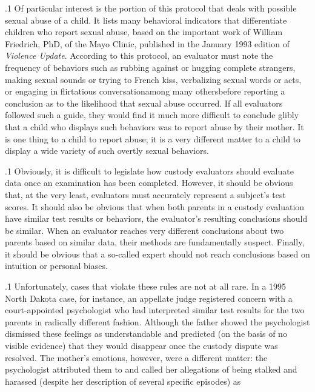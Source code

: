 \documentclass[11pt, twoside]{article}
\begin{document}
{\p.1{%
Of particular interest is the portion of this protocol that deals with
possible sexual abuse of a child. It lists many behavioral indicators that
differentiate children who report sexual abuse, based on the important work of William Friedrich, PhD, of the Mayo Clinic, published in
the January 1993 edition of \textit{Violence Update}.
According to this protocol, an evaluator must note the frequency of behaviors such as rubbing
against or hugging complete strangers, making sexual sounds or trying
to French kiss, verbalizing sexual words or acts, or engaging in flirtatious
conversation\mdash{}among many others\mdash{}before reporting a conclusion as to
the likelihood that sexual abuse occurred. If all evaluators followed such
a guide, they would find it much more difficult to conclude glibly that a
child who displays such behaviors was  to report abuse by their
mother. It is one thing to  a child to report abuse; it is a very different matter to  a child to display a wide variety of such overtly
sexual behaviors.
}%

\p.1{%
Obviously, it is difficult to legislate how custody evaluators should
evaluate data once an examination has been completed. However, it
should be obvious that, at the very least, evaluators must accurately represent a subject’s test scores. It should also be obvious that when both
parents in a custody evaluation have similar test results or behaviors,
the evaluator’s resulting conclusions should be similar. When an evaluator reaches very different conclusions about two parents based on
similar data, their methods are fundamentally suspect. Finally, it should
be obvious that a so-called expert should not reach conclusions based
on intuition or personal biases.
}%

\p.1{%
Unfortunately, cases that violate these rules are not at all rare. In a
1995 North Dakota case, for instance, an appellate judge registered concern with a court-appointed psychologist who had interpreted similar
test results for the two parents in radically different fashion. Although
the father showed  the psychologist dismissed these
feelings as understandable and predicted (on the basis of no visible
evidence) that they would disappear once the custody dispute was resolved. The mother’s emotions, however, were a different matter: the
psychologist attributed them to  and called her allegations of
being stalked and harassed (despite her description of several specific
episodes) as 
}%

}
\end{document}
